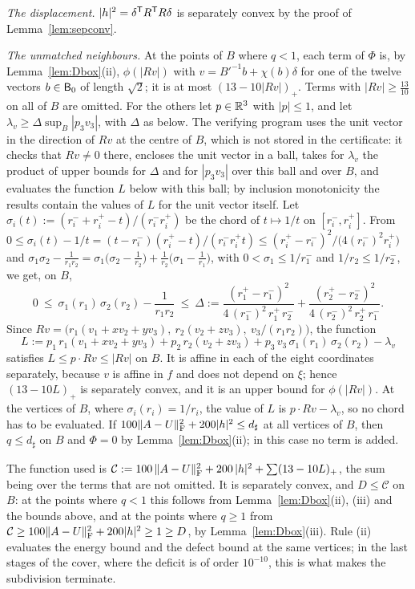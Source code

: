 \emph{The displacement.} $|h|^2=\delta^\mathsf T R^\mathsf T R\delta$ is separately convex by the proof of Lemma~\ref{lem:sepconv}.

\emph{The unmatched neighbours.} At the points of $B$ where $q<1$, each term of $\Phi$ is, by Lemma~\ref{lem:Dbox}(ii),
$\phi(|Rv|)$ with $v=B'^{-1}b+\chi(b)\delta$ for one of the twelve vectors $b\in\mathsf B_0$ of length $\sqrt2$; it is at most
$(13-10|Rv|)_+$. Terms with $|Rv|\ge\frac{13}{10}$ on all of $B$ are omitted. For the others let $p\in\mathbb R^3$ with $|p|\le1$,
and let $\lambda_v\ge\Delta\sup_B|p_3v_3|$, with $\Delta$ as below. The verifying program uses the unit vector in the direction of
$Rv$ at the centre of $B$, which is not stored in the certificate: it checks that $Rv\ne0$ there, encloses the unit vector in a
ball, takes for $\lambda_v$ the product of upper bounds for $\Delta$ and for $|p_3v_3|$ over this ball and over $B$, and evaluates
the function $L$ below with this ball; by inclusion monotonicity the results contain the values of $L$ for the unit vector itself.
Let
$\sigma_i(t):=(r_i^-+r_i^+-t)/(r_i^-r_i^+)$ be the chord of $t\mapsto1/t$ on $[r_i^-,r_i^+]$. From
$0\le\sigma_i(t)-1/t=(t-r_i^-)(r_i^+-t)/(r_i^-r_i^+t)\le(r_i^+-r_i^-)^2/\bigl(4(r_i^-)^2r_i^+\bigr)$ and
$\sigma_1\sigma_2-\frac1{r_1r_2}=\sigma_1\bigl(\sigma_2-\frac1{r_2}\bigr)+\frac1{r_2}\bigl(\sigma_1-\frac1{r_1}\bigr)$, with
$0<\sigma_1\le1/r_1^-$ and $1/r_2\le1/r_2^-$, we get, on $B$,
\[
  0\ \le\ \sigma_1(r_1)\,\sigma_2(r_2)-\frac1{r_1r_2}\ \le\ \Delta:=\frac{(r_1^+-r_1^-)^2}{4\,(r_1^-)^2\,r_1^+\,r_2^-}+\frac{(r_2^+-r_2^-)^2}{4\,(r_2^-)^2\,r_2^+\,r_1^-} .
\]
Since $Rv=\bigl(r_1(v_1+xv_2+yv_3),\ r_2(v_2+zv_3),\ v_3/(r_1r_2)\bigr)$, the function
\[
  L:=p_1\,r_1(v_1+xv_2+yv_3)+p_2\,r_2(v_2+zv_3)+p_3\,v_3\,\sigma_1(r_1)\,\sigma_2(r_2)-\lambda_v
\]
satisfies $L\le p\cdot Rv\le|Rv|$ on $B$. It is affine in each of the eight coordinates separately, because $v$ is affine in $f$ and
does not depend on $\xi$; hence $(13-10L)_+$ is separately convex, and it is an upper bound for $\phi(|Rv|)$. At the vertices of
$B$, where $\sigma_i(r_i)=1/r_i$, the value of $L$ is $p\cdot Rv-\lambda_v$, so no chord has to be evaluated. If
$100\|A-U\|_\mathrm F^2+200|h|^2\le d_\sharp$ at all vertices of $B$, then $q\le d_\sharp$ on $B$ and $\Phi=0$ by
Lemma~\ref{lem:Dbox}(ii); in this case no term is added.

The function used is $\mathcal C:=100\,\|A-U\|_\mathrm F^2+200\,|h|^2+\sum(13-10L)_+$, the sum being over the terms that are not omitted.
It is separately convex, and $D\le\mathcal C$ on $B$: at the points where $q<1$ this follows from Lemma~\ref{lem:Dbox}(ii),
(iii) and the bounds above, and at the points where $q\ge1$ from
$\mathcal C\ge100\|A-U\|_\mathrm F^2+200|h|^2\ge1\ge D$, by Lemma~\ref{lem:Dbox}(iii). Rule (ii) evaluates the energy bound and the
defect bound at the same vertices; in the last stages of the cover, where the deficit is of order $10^{-10}$, this is what makes
the subdivision terminate.

